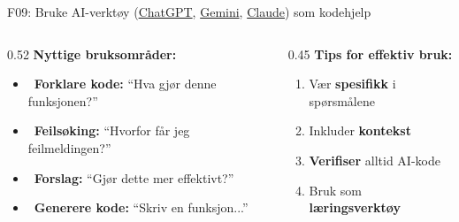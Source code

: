 \documentclass[aspectratio=169, 10pt]{beamer}
\begin{document}
\begin{frame}{F09: Bruke AI-verktøy (\href{https://chat.openai.com/}{ChatGPT}, \href{https://gemini.google.com/}{Gemini}, \href{https://claude.ai/}{Claude}) som kodehjelp}
    \begin{columns}[T]
        \begin{column}{0.52\textwidth}
            \textbf{Nyttige bruksområder:}
            \begin{itemize}
                \item \faCode~\textbf{Forklare kode:} ``Hva gjør denne funksjonen?''
                \item \faBug~\textbf{Feilsøking:} ``Hvorfor får jeg feilmeldingen?''
                \item \faLightbulb~\textbf{Forslag:} ``Gjør dette mer effektivt?''
                \item \faPuzzlePiece~\textbf{Generere kode:} ``Skriv en funksjon...''
            \end{itemize}
        \end{column}
        \begin{column}{0.45\textwidth}
            \textbf{Tips for effektiv bruk:}
            \begin{enumerate}
                \item Vær \textbf{spesifikk} i spørsmålene
                \item Inkluder \textbf{kontekst}
                \item \textbf{Verifiser} alltid AI-kode
                \item Bruk som \textbf{læringsverktøy}
            \end{enumerate}
        \end{column}
    \end{columns}


\end{frame}
\end{document}

